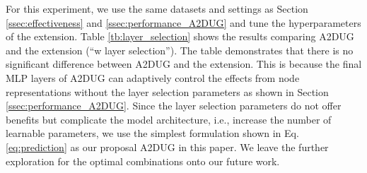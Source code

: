 For this experiment, we use the same datasets and settings as Section \ref{ssec:effectiveness} and \ref{ssec:performance_A2DUG} and tune the hyperparameters of the extension. 
Table \ref{tb:layer_selection} shows the results comparing A2DUG and the extension (``w layer selection'').
The table demonstrates that there is no significant difference between A2DUG and the extension. 
This is because the final MLP layers of A2DUG can adaptively control the effects from node representations without the layer selection parameters as shown in Section \ref{ssec:performance_A2DUG}. 
Since the layer selection parameters do not offer benefits but complicate the model architecture, i.e., increase the number of learnable parameters, we use the simplest formulation shown in Eq. \eqref{eq:prediction} as our proposal A2DUG in this paper.
We leave the further exploration for the optimal combinations onto our future work.
